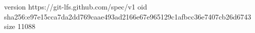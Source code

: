 version https://git-lfs.github.com/spec/v1
oid sha256:e97e15cca7da2dd769caae493ad2166e67e965129c1afbcc36e7407cb26d6743
size 11088
